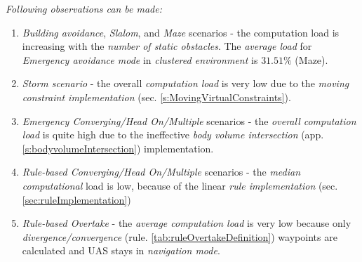 \noindent \emph{Following observations can be made:}

\begin{enumerate}
    \item \emph{Building avoidance}, \emph{Slalom}, and \emph{Maze} scenarios - the computation load is increasing with the \emph{number of static obstacles}. The \emph{average load} for \emph{Emergency avoidance mode} in \emph{clustered environment} is $31.51\%$ (Maze).
    
    \item \emph{Storm scenario} - the overall \emph{computation load} is very low due to the \emph{moving constraint implementation} (sec. \ref{s:MovingVirtualConstraints}).
    
    \item\emph{Emergency Converging/Head On/Multiple} scenarios - the \emph{overall computation load} is quite high due to the ineffective \emph{body volume intersection} (app. \ref{s:bodyvolumeIntersection}) implementation.
    
    \item \emph{Rule-based Converging/Head On/Multiple} scenarios - the \emph{median computational} load is low, because of the linear \emph{rule implementation} (sec. \ref{sec:ruleImplementation})
    
    \item \emph{Rule-based Overtake} - the \emph{average computation load} is very low because only \emph{divergence/convergence} (rule. \ref{tab:ruleOvertakeDefinition}) waypoints are calculated and UAS stays in \emph{navigation mode}.
\end{enumerate}